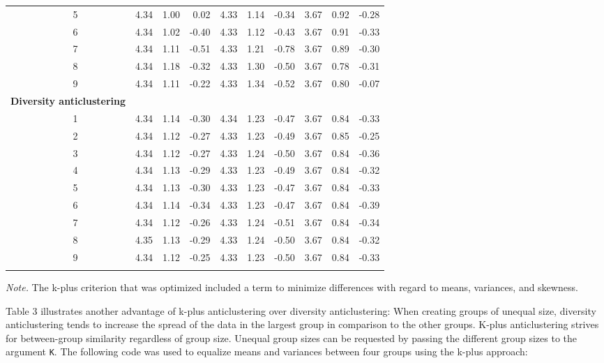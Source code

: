 \documentclass[
  man,floatsintext]{apa7}
\begin{document}
\begin{table}[tbp]
\begin{center}
\begin{threeparttable}
\begin{tabular}{crrrrrrrrr}
\ \ \ 5 & 4.34 & 1.00 & 0.02 & 4.33 & 1.14 & -0.34 & 3.67 & 0.92 & -0.28\\
\ \ \ 6 & 4.34 & 1.02 & -0.40 & 4.33 & 1.12 & -0.43 & 3.67 & 0.91 & -0.33\\
\ \ \ 7 & 4.34 & 1.11 & -0.51 & 4.33 & 1.21 & -0.78 & 3.67 & 0.89 & -0.30\\
\ \ \ 8 & 4.34 & 1.18 & -0.32 & 4.33 & 1.30 & -0.50 & 3.67 & 0.78 & -0.31\\
\ \ \ 9 & 4.34 & 1.11 & -0.22 & 4.33 & 1.34 & -0.52 & 3.67 & 0.80 & -0.07\\
\textbf{Diversity anticlustering} &  &  &  &  &  &  &  &  & \\
\ \ \ 1 & 4.34 & 1.14 & -0.30 & 4.34 & 1.23 & -0.47 & 3.67 & 0.84 & -0.33\\
\ \ \ 2 & 4.34 & 1.12 & -0.27 & 4.33 & 1.23 & -0.49 & 3.67 & 0.85 & -0.25\\
\ \ \ 3 & 4.34 & 1.12 & -0.27 & 4.33 & 1.24 & -0.50 & 3.67 & 0.84 & -0.36\\
\ \ \ 4 & 4.34 & 1.13 & -0.29 & 4.33 & 1.23 & -0.49 & 3.67 & 0.84 & -0.32\\
\ \ \ 5 & 4.34 & 1.13 & -0.30 & 4.33 & 1.23 & -0.47 & 3.67 & 0.84 & -0.33\\
\ \ \ 6 & 4.34 & 1.14 & -0.34 & 4.33 & 1.23 & -0.47 & 3.67 & 0.84 & -0.39\\
\ \ \ 7 & 4.34 & 1.12 & -0.26 & 4.33 & 1.24 & -0.51 & 3.67 & 0.84 & -0.34\\
\ \ \ 8 & 4.35 & 1.13 & -0.29 & 4.33 & 1.24 & -0.50 & 3.67 & 0.84 & -0.32\\
\ \ \ 9 & 4.34 & 1.12 & -0.25 & 4.33 & 1.23 & -0.50 & 3.67 & 0.84 & -0.33\\
\bottomrule
\addlinespace
\end{tabular}

\begin{tablenotes}[para]
\normalsize{\textit{Note.} The k-plus criterion that was optimized included a term to minimize differences with regard to means, variances, and skewness.}
\end{tablenotes}

\end{threeparttable}
\end{center}

\end{table}

Table 3 illustrates another advantage of k-plus anticlustering over diversity anticlustering: When creating groups of unequal size, diversity anticlustering tends to increase the spread of the data in the largest group in comparison to the other groups. K-plus anticlustering strives for between-group similarity regardless of group size. Unequal group sizes can be requested by passing the different group sizes to the argument \texttt{K}. The following code was used to equalize means and variances between four groups using the k-plus approach:
\end{document}
